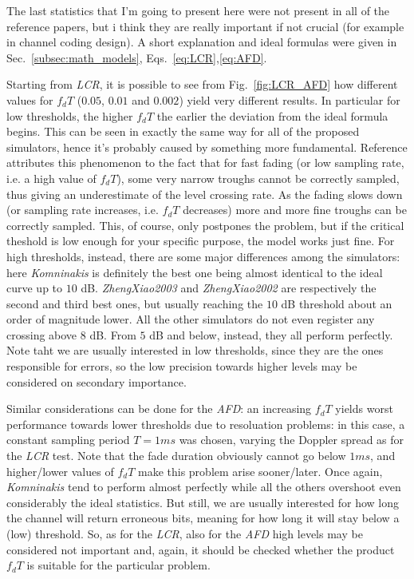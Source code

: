 The last statistics that I'm going to present here were not present in all of the reference papers, but i think they are really important if not crucial (for example in channel coding design). A short explanation and ideal formulas were given in Sec.~\ref{subsec:math_models}, Eqs.~\ref{eq:LCR},\ref{eq:AFD}.

Starting from \textit{LCR}, it is possible to see from Fig.~\ref{fig:LCR_AFD} how different values for $f_dT$ ($0.05$, $0.01$ and $0.002$) yield very different results. In particular for low thresholds, the higher $f_dT$ the earlier the deviation from the ideal formula begins. This can be seen in exactly the same way for all of the proposed simulators, hence it's probably caused by something more fundamental. Reference \cite{A3} attributes this phenomenon to the fact that for fast fading (or low sampling rate, i.e. a high value of $f_dT$), some very narrow troughs cannot be correctly sampled, thus giving an underestimate of the level crossing rate. As the fading slows down (or sampling rate increases, i.e. $f_dT$ decreases) more and more fine troughs can be correctly sampled. This, of course, only postpones the problem, but if the critical theshold is low enough for your specific purpose, the model works just fine.
For high thresholds, instead, there are some major differences among the simulators: here \textit{Komninakis} is definitely the best one being almost identical to the ideal curve up to $10$ dB. \textit{ZhengXiao2003} and \textit{ZhengXiao2002} are respectively the second and third best ones, but usually reaching the $10$ dB threshold about an order of magnitude lower. All the other simulators do not even register any crossing above $8$ dB. From $5$ dB and below, instead, they all perform perfectly. Note taht we are usually interested in low thresholds, since they are the ones responsible for errors, so the low precision towards higher levels may be considered on secondary importance.

Similar considerations can be done for the \textit{AFD}: an increasing $f_dT$ yields worst performance towards lower thresholds due to resoluation problems: in this case, a constant sampling period $T=1 ms$ was chosen, varying the Doppler spread as for the \textit{LCR} test. Note that the fade duration obviously cannot go below $1ms$, and higher/lower values of $f_dT$ make this problem arise sooner/later. Once again, \textit{Komninakis} tend to perform almost perfectly while all the others overshoot even considerably the ideal statistics. But still, we are usually interested for how long the channel will return erroneous bits, meaning for how long it will stay below a (low) threshold. So, as for the \textit{LCR}, also for the \textit{AFD} high levels may be considered not important and, again, it should be checked whether the product $f_dT$ is suitable for the particular problem.

